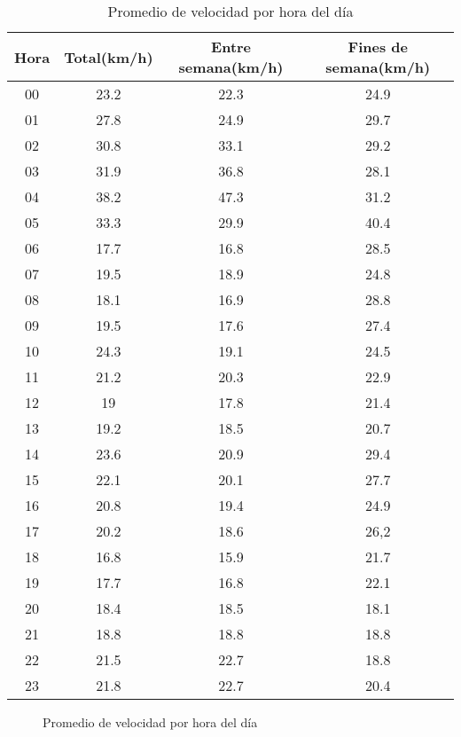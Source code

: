 \begin{table}[h]
	\centering
	\begin{tabular}{cccc}
        \toprule
    	Hora  & Total(km/h) & Entre semana(km/h) & Fines de semana(km/h)\\
    	\midrule
    	00 & 23.2 & 22.3 & 24.9 \\
    	01 & 27.8 & 24.9 & 29.7 \\
    	02 & 30.8 & 33.1 & 29.2 \\ 
    	03 & 31.9 & 36.8 & 28.1\\
    	04 & 38.2 & 47.3 & 31.2\\
    	05 & 33.3 & 29.9 & 40.4\\
    	06 & 17.7 & 16.8 & 28.5\\
    	07 & 19.5 & 18.9 & 24.8\\
    	08 & 18.1 & 16.9 & 28.8\\
    	09 & 19.5 & 17.6 & 27.4\\ 
    	10 & 24.3 & 19.1 & 24.5\\
    	11 & 21.2 & 20.3 & 22.9\\
    	12 & 19 & 17.8 & 21.4\\
    	13 & 19.2 & 18.5 & 20.7\\
    	14 & 23.6 & 20.9 & 29.4\\
    	15 & 22.1 & 20.1 & 27.7\\
    	16 & 20.8 & 19.4 & 24.9\\ 
    	17 & 20.2 & 18.6 & 26,2\\
    	18 & 16.8 & 15.9 & 21.7\\
    	19 & 17.7 & 16.8 & 22.1\\
    	20 & 18.4 & 18.5 & 18.1\\
    	21 & 18.8 & 18.8 & 18.8\\
    	22 & 21.5 & 22.7 & 18.8\\
    	23 & 21.8 & 22.7 & 20.4\\
    	\bottomrule
	\end{tabular}
	\caption{Promedio de velocidad por hora del día} 
	\label{table:velocidad_por_hora}
\end{table}

\begin{figure}[h]
\centering
{}
\caption{Promedio de velocidad por hora del día}
\label{fig:promedio_velocidad}
\end{figure}

